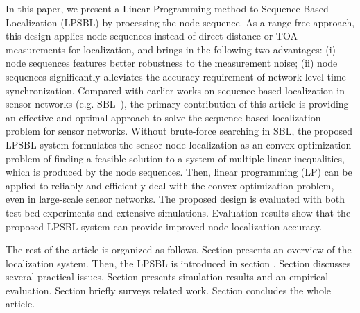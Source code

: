 In this paper, we present a Linear Programming method to Sequence-Based Localization (LPSBL) by processing the node sequence. 
As a range-free approach, this design applies node sequences instead of direct distance
or TOA measurements for localization, and brings in the following two advantages: (i) node sequences features better
robustness to the measurement noise; (ii) node sequences significantly alleviates the accuracy requirement of network level time synchronization. 
Compared with earlier works on sequence-based localization in sensor
networks (e.g. SBL~\cite{yedavalli2008sequence}), the primary contribution
of this article is providing an effective and optimal approach
to solve the sequence-based localization problem for sensor networks. 
Without brute-force searching in SBL, the proposed LPSBL system formulates the
sensor node localization as an convex optimization problem
of finding a feasible solution to a system of multiple linear
inequalities, which is produced by the node sequences.
Then, linear programming (LP) can be applied to reliably
and efficiently deal with the convex optimization problem,
even in large-scale sensor networks. The proposed design
is evaluated with both test-bed experiments and extensive
simulations. Evaluation results show that the proposed
LPSBL system can provide improved node localization
accuracy.


The rest of the article is organized as follows. Section \uppercase\expandafter{} presents an overview of the  localization system.
Then, the LPSBL is introduced in section \uppercase\expandafter{}.
Section \uppercase\expandafter{} discusses several practical issues.
Section \uppercase\expandafter{} presents simulation results and an empirical evaluation. Section \uppercase\expandafter{} briefly surveys related work.
Section \uppercase\expandafter{} concludes the whole article.



